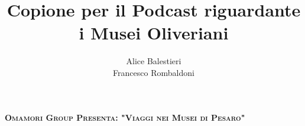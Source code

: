\documentclass[hidelinks,12pt,a4paper]{article}
\begin{document}
	\begin{flushleft}
		
		\title{\textbf{Copione per il Podcast riguardante i Musei Oliveriani}}
		\author{Alice Balestieri\\Francesco Rombaldoni}
		\date{}
		
		\item {\scshape\bfseries Omamori Group Presenta: "Viaggi nei Musei di Pesaro"\\}
		

\end{flushleft}
\end{document}
